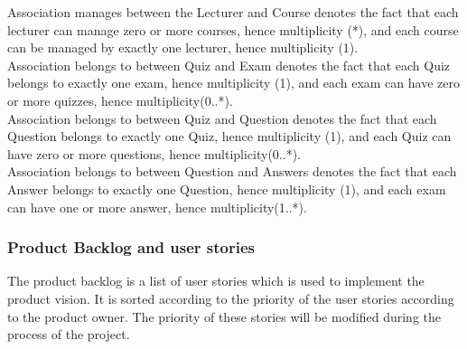 \documentclass{scrartcl}
\begin{document}
Association manages between the Lecturer and Course denotes the fact that each lecturer can manage zero or more courses, hence multiplicity (*), and each course can be managed by exactly one lecturer, hence multiplicity (1). \\
Association belongs to between Quiz and Exam denotes the fact that each Quiz belongs to exactly one exam, hence multiplicity (1), and each exam can have zero or more quizzes, hence multiplicity(0..*). \\
Association belongs to between Quiz and Question denotes the fact that each Question belongs to exactly one Quiz, hence multiplicity (1), and each Quiz can have zero or more questions, hence multiplicity(0..*). \\
Association belongs to between Question and Answers denotes the fact that each Answer belongs to exactly one Question, hence multiplicity (1), and each exam can have one or more answer, hence multiplicity(1..*). \cite{sed}\\
\subsubsection{Product Backlog and user stories}
The product backlog is a list of user stories which is used to implement the product vision. It is sorted according to the priority of the user stories according to the product owner. The priority of these stories will be modified during the process of the project.\\


 
\end{document}
